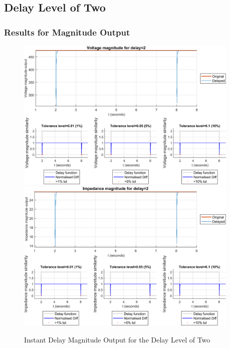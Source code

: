 \subsection{Delay Level of Two}
\subsubsection{Results for Magnitude Output}
\begin{figure}
    \caption{Instant Delay Magnitude Output for the Delay Level of Two}
    \includegraphics[width=0.95\textwidth]{PMUsim-figures/DelayOf_2/Instant_vMagnitude.png}    
      \includegraphics[width=0.95\textwidth]{PMUsim-figures/DelayOf_2/Instant_iMagnitude.png}
    \label{fig:PMUsim_Two_Magnitude}
    \begin{small}
     \end{small}
\end{figure}
